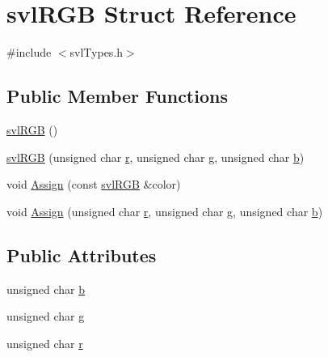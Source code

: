 \hypertarget{structsvl_r_g_b}{\section{svl\-R\-G\-B Struct Reference}
\label{structsvl_r_g_b}
}


{\ttfamily \#include $<$svl\-Types.\-h$>$}

\subsection*{Public Member Functions}
\begin{DoxyCompactItemize}
\item 
\hyperlink{structsvl_r_g_b_a532c9ac3487c554f172524a56f2e96cc}{svl\-R\-G\-B} ()
\item 
\hyperlink{structsvl_r_g_b_a0f422c113dddebfa69270ac93f07a7d5}{svl\-R\-G\-B} (unsigned char \hyperlink{structsvl_r_g_b_a823fa06835ecc0bbcdc9b121a13631da}{r}, unsigned char \hyperlink{structsvl_r_g_b_aad56aeef6a029768848b46ea91b7332c}{g}, unsigned char \hyperlink{structsvl_r_g_b_ab426f773070147f8a3bced446636662d}{b})
\item 
void \hyperlink{structsvl_r_g_b_a21f5a70015d23823a658ea49e590b40d}{Assign} (const \hyperlink{structsvl_r_g_b}{svl\-R\-G\-B} \&color)
\item 
void \hyperlink{structsvl_r_g_b_a297344a5cd767c5d23a54b4105c8c193}{Assign} (unsigned char \hyperlink{structsvl_r_g_b_a823fa06835ecc0bbcdc9b121a13631da}{r}, unsigned char \hyperlink{structsvl_r_g_b_aad56aeef6a029768848b46ea91b7332c}{g}, unsigned char \hyperlink{structsvl_r_g_b_ab426f773070147f8a3bced446636662d}{b})
\end{DoxyCompactItemize}
\subsection*{Public Attributes}
\begin{DoxyCompactItemize}
\item 
unsigned char \hyperlink{structsvl_r_g_b_ab426f773070147f8a3bced446636662d}{b}
\item 
unsigned char \hyperlink{structsvl_r_g_b_aad56aeef6a029768848b46ea91b7332c}{g}
\item 
unsigned char \hyperlink{structsvl_r_g_b_a823fa06835ecc0bbcdc9b121a13631da}{r}
\end{DoxyCompactItemize}


